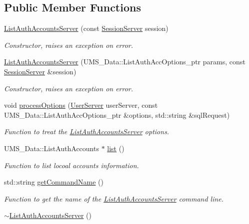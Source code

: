 \subsection*{Public Member Functions}
\begin{DoxyCompactItemize}
\item 
\hyperlink{classListAuthAccountsServer_a8bc351f0964a4f89311ad6a84f5dbe57}{ListAuthAccountsServer} (const \hyperlink{classSessionServer}{SessionServer} session)
\begin{DoxyCompactList}\small\item\em Constructor, raises an exception on error. \item\end{DoxyCompactList}\item 
\hyperlink{classListAuthAccountsServer_a79ce74e37213d631839ade590a9ec54c}{ListAuthAccountsServer} (UMS\_\-Data::ListAuthAccOptions\_\-ptr params, const \hyperlink{classSessionServer}{SessionServer} \&session)
\begin{DoxyCompactList}\small\item\em Constructor, raises an exception on error. \item\end{DoxyCompactList}\item 
void \hyperlink{classListAuthAccountsServer_a5af5cc404b4302676d3a484fbd10b9fc}{processOptions} (\hyperlink{classUserServer}{UserServer} userServer, const UMS\_\-Data::ListAuthAccOptions\_\-ptr \&options, std::string \&sqlRequest)
\begin{DoxyCompactList}\small\item\em Function to treat the \hyperlink{classListAuthAccountsServer}{ListAuthAccountsServer} options. \item\end{DoxyCompactList}\item 
UMS\_\-Data::ListAuthAccounts $\ast$ \hyperlink{classListAuthAccountsServer_a0787fa2a4d9dd1b78ea1966d0fafc90d}{list} ()
\begin{DoxyCompactList}\small\item\em Function to list locoal accounts information. \item\end{DoxyCompactList}\item 
std::string \hyperlink{classListAuthAccountsServer_a016e94aa8daa9c91d79d71ff52394d89}{getCommandName} ()
\begin{DoxyCompactList}\small\item\em Function to get the name of the \hyperlink{classListAuthAccountsServer}{ListAuthAccountsServer} command line. \item\end{DoxyCompactList}\item 
\hypertarget{classListAuthAccountsServer_a5222bb7402b5820b832de8de41e6994f}{
\hyperlink{classListAuthAccountsServer_a5222bb7402b5820b832de8de41e6994f}{$\sim$ListAuthAccountsServer} ()}
\label{classListAuthAccountsServer_a5222bb7402b5820b832de8de41e6994f}


\end{DoxyCompactItemize}
